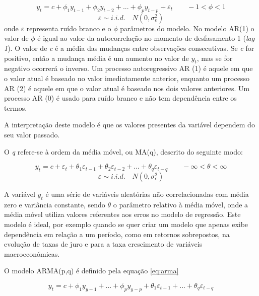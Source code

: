 \documentclass[
  12pt,
  a4paper,
  openany]{book}
\theoremstyle{definition}
\theoremstyle{definition}
\theoremstyle{definition}
\theoremstyle{remark}
\begin{document}
\begin{equation} 
  y_t =c+\phi_1y_{t-1}+\phi_2y_{t-2}+...+\phi_py_{t-p}+\varepsilon_t\qquad   -1<\phi<1
  \label{eq:ar}
\end{equation}
\begin{equation} 
  \nonumber \varepsilon \sim i.i.d. \quad N(0,\sigma_{\epsilon}^{2})
\end{equation}
onde \(\varepsilon\) representa ruído branco e o \(\phi\) parâmetros do modelo. No modelo AR(1) o valor de \(\phi\) é igual ao valor da autocorrelação no momento de desfasamento 1 (\emph{lag 1}). O valor de \emph{c} é a média das mudanças entre observações consecutivas. Se \emph{c} for positivo, então a mudança média é um aumento no valor de \(y_t\), mas se for negativo ocorrerá o inverso. Um processo autoregressivo AR (1) é aquele em que o valor atual é baseado no valor imediatamente anterior, enquanto um processo AR (2) é aquele em que o valor atual é baseado nos dois valores anteriores. Um processo AR (0) é usado para ruído branco e não tem dependência entre os termos.

A interpretação deste modelo é que os valores presentes da variável dependem do seu valor passado.

O \emph{q} refere-se à ordem da média móvel, ou MA(q), descrito do seguinte modo:

\begin{equation} 
  y_t =c+\varepsilon_t+\theta_1\varepsilon_{t-1}+\theta_2\varepsilon_{t-2}+...+\theta_q\varepsilon_{t-q}\qquad   -\infty<\theta<\infty 
  \label{eq:ma}
\end{equation}
\begin{equation} 
  \nonumber \varepsilon \sim i.i.d. \quad N(0,\sigma_{\epsilon}^{2})
\end{equation}

A variável \(y_t\) é uma série de variáveis aleatórias não correlacionadas com média zero e variância constante, sendo \(\theta\) o parâmetro relativo à média móvel, onde a média móvel utiliza valores referentes aos erros no modelo de regressão. Este modelo é ideal, por exemplo quando se quer criar um modelo que apenas exibe dependência em relação a um período, como em retornos sobrepostos, na evolução de taxas de juro e para a taxa crescimento de variáveis macroeconómicas.

O modelo ARMA(p,q) é definido pela equação \eqref{eq:arma}

\begin{equation} 
  y_t =c+\phi_1y_{y-1}+...+\phi_py_{y-p}+\theta_1\varepsilon_{t-1}+...+\theta_q\varepsilon_{t-q}
  \label{eq:arma}
\end{equation}
\end{document}
